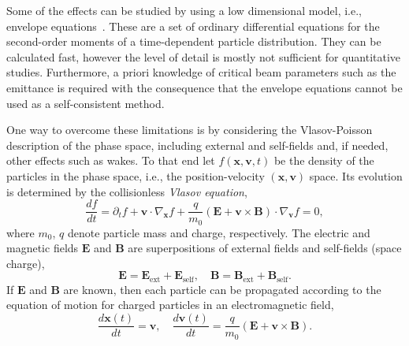 \documentclass[a4paper,10pt,3p,preprint,pdftex]{elsarticle}
\newcommand {\RM}[1]{\mathrm{#1}}
\renewcommand{\Re}{\mathbb{R}}
\begin{document}
Some of the effects can be studied by using a low dimensional model,
i.e., envelope equations~\cite{sach:68, sach:71, stru-reis:1984,
  gluckstern1}.  These are a set of ordinary differential equations for
the second-order moments of a time-dependent particle distribution.
They can be calculated fast, however the level of detail is mostly not
sufficient for quantitative studies.  Furthermore, a priori knowledge of
critical beam parameters such as the emittance is required with the consequence that the
envelope equations cannot be used as a self-consistent method.

One way to overcome these limitations is by considering the
Vlasov-Poisson description of the phase space, including external and
self-fields and, if needed, other effects such as wakes.  To that end
let $f(\mathbf{x},\mathbf{v},t)$ be the density of the particles in the
phase space, i.e., the position-velocity $(\mathbf{x}, \mathbf{v})$
space.  Its evolution is determined by the collisionless \emph{Vlasov
  equation},
\begin{equation}\label{eq:Vlasov}
  \frac{df}{dt}=\partial_t f + \mathbf{v} \cdot \nabla_{\mathbf{x}} f
  +\frac{q}{m_0}(\mathbf{E}+ \mathbf{v}\times\mathbf{B})\cdot
  \nabla_{\mathbf{v}} f  =  0,
\end{equation}
where $m_0$, $q$ denote particle mass and charge, respectively.  The
electric and magnetic fields $\mathbf{E}$ and $\mathbf{B}$ are
superpositions of external fields and self-fields (space charge),
\begin{equation}\label{eq:allfield}
    \mathbf{E} =
    \mathbf{E_{\RM{ext}}} + \mathbf{E_{\RM{self}}}, \quad
    \mathbf{B} =
    \mathbf{B_{\RM{ext}}} + \mathbf{B_{\RM{self}}}.
\end{equation}
If $\mathbf{E}$ and $\mathbf{B}$ are known, then each particle can be
propagated according to the equation of motion for charged particles in an
electromagnetic field,
\begin{equation*}\label{eq:motion}
  \frac{d\mathbf{x}(t)}{dt}  = \mathbf{v},
  \quad
  \frac{d\mathbf{v}(t)}{dt}  = \frac{q}{m_0}\left(\mathbf{E} +
    \mathbf{v}\times \mathbf{B}\right).
\end{equation*}
\end{document}
